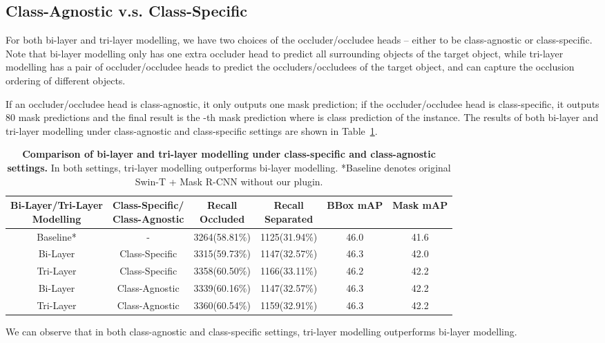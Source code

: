 \documentclass{bmvc2k}
\begin{document}
\subsection{Class-Agnostic v.s. Class-Specific}
\label{sec:sup_other_discussion_agnostic}


For both bi-layer and tri-layer modelling, we have two choices of the occluder/occludee heads -- either to be class-agnostic or class-specific. Note that bi-layer modelling only has one extra occluder head to predict all surrounding objects of the target object, while tri-layer modelling has a pair of occluder/occludee heads to predict the occluders/occludees of the target object, and  can capture the occlusion ordering of different objects.



If an occluder/occludee head is class-agnostic, it only outputs one mask prediction; if the occluder/occludee head is class-specific, it outputs 80 mask predictions and the final result is the -th mask prediction where  is class prediction of the instance. The results of both bi-layer and tri-layer modelling under class-agnostic and class-specific settings are shown in Table~\ref{table:sup_discussion_agnostic}.


\begin{table}[h]

\centering
\tabcolsep=0.08cm
\begin{tabular}{cccccc}
\toprule
  \thead{Bi-Layer/Tri-Layer \\ Modelling} & \thead{Class-Specific/ \\ Class-Agnostic} & \thead{Recall \\ Occluded} & \thead{Recall \\ Separated} & BBox mAP & Mask mAP  \\ \midrule
  Baseline* & - & 3264(58.81\%) & 1125(31.94\%) & 46.0 & 41.6 \\
  Bi-Layer & Class-Specific & 3315(59.73\%) & 1147(32.57\%) & 46.3 & 42.0 \\ 
  Tri-Layer & Class-Specific & 3358(60.50\%) & 1166(33.11\%) & 46.2 & 42.2 \\ 
  Bi-Layer & Class-Agnostic & 3339(60.16\%) & 1147(32.57\%) & 46.3 & 42.2 \\ 
  Tri-Layer & Class-Agnostic & 3360(60.54\%) & 1159(32.91\%) & 46.3 & 42.2 \\ \bottomrule
\end{tabular}
\vspace{.4cm}
\caption{\color{bmvc_blue} \textbf{Comparison of bi-layer and tri-layer modelling under class-specific and class-agnostic settings.} In both settings, tri-layer modelling outperforms bi-layer modelling. *Baseline denotes original Swin-T + Mask R-CNN without our plugin.}
\label{table:sup_discussion_agnostic}
\end{table}


We can observe that in both class-agnostic and class-specific settings, tri-layer modelling outperforms bi-layer modelling. 
 
\end{document}
